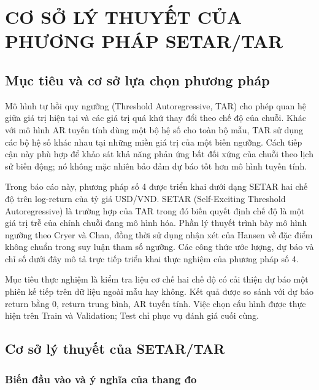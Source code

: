 \documentclass[a4paper,reqno,oneside]{book}
\numberwithin{equation}{chapter}
\begin{document}
\fontsize{13}{20}\selectfont


\chapter{CƠ SỞ LÝ THUYẾT CỦA PHƯƠNG PHÁP SETAR/TAR}
\label{chap:setar-theory}

\section{Mục tiêu và cơ sở lựa chọn phương pháp}

Mô hình tự hồi quy ngưỡng (Threshold Autoregressive, TAR) cho phép quan hệ giữa giá trị hiện tại và các giá trị quá khứ thay đổi theo chế độ của chuỗi. Khác với mô hình AR tuyến tính dùng một bộ hệ số cho toàn bộ mẫu, TAR sử dụng các bộ hệ số khác nhau tại những miền giá trị của một biến ngưỡng. Cách tiếp cận này phù hợp để khảo sát khả năng phản ứng bất đối xứng của chuỗi theo lịch sử biến động; nó không mặc nhiên bảo đảm dự báo tốt hơn mô hình tuyến tính.

Trong báo cáo này, phương pháp số 4 được triển khai dưới dạng SETAR hai chế độ trên log-return của tỷ giá USD/VND. SETAR (Self-Exciting Threshold Autoregressive) là trường hợp của TAR trong đó biến quyết định chế độ là một giá trị trễ của chính chuỗi đang mô hình hóa. Phần lý thuyết trình bày mô hình ngưỡng theo Cryer và Chan, đồng thời sử dụng nhận xét của Hansen về đặc điểm không chuẩn trong suy luận tham số ngưỡng. Các công thức ước lượng, dự báo và chỉ số dưới đây mô tả trực tiếp triển khai thực nghiệm của phương pháp số 4.

Mục tiêu thực nghiệm là kiểm tra liệu cơ chế hai chế độ có cải thiện dự báo một phiên kế tiếp trên dữ liệu ngoài mẫu hay không. Kết quả được so sánh với dự báo return bằng 0, return trung bình, AR tuyến tính. Việc chọn cấu hình được thực hiện trên Train và Validation; Test chỉ phục vụ đánh giá cuối cùng.

\section{Cơ sở lý thuyết của SETAR/TAR}

\subsection{Biến đầu vào và ý nghĩa của thang đo}
\end{document}

